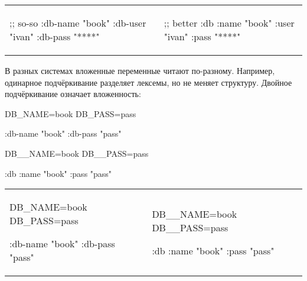 \else

\begin{english}

\noindent
\begin{tabular}{ @{}p{5cm} @{}p{5cm} }

  \begin{clojure}
;; so-so
{:db-name "book"
 :db-user "ivan"
 :db-pass "****"}
  \end{clojure}

&

  \begin{clojure}
;; better
{:db {:name "book"
      :user "ivan"
      :pass "****"}}
  \end{clojure}

\end{tabular}

\end{english}

\fi

В разных системах вложенные переменные читают по-разному. Например, одинарное
подчёркивание разделяет лексемы, но не меняет структуру. Двойное подчёркивание
означает вложенность:

\ifx\DEVICETYPE\MOBILE

\begin{english}
  \begin{clojure}
DB_NAME=book
DB_PASS=pass

{:db-name "book"
 :db-pass "pass"}
  \end{clojure}

\splitter

  \begin{clojure}
DB__NAME=book
DB__PASS=pass

{:db {:name "book"
      :pass "pass"}}
  \end{clojure}
\end{english}

\else

\begin{english}

\noindent
\begin{tabular}{ @{}p{5cm} @{}p{5cm} }

  \begin{clojure}
DB_NAME=book
DB_PASS=pass

{:db-name "book"
 :db-pass "pass"}
  \end{clojure}

&

  \begin{clojure}
DB__NAME=book
DB__PASS=pass

{:db {:name "book"
      :pass "pass"}}
  \end{clojure}

\end{tabular}

\end{english}

